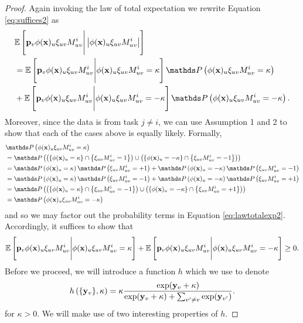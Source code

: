 \documentclass{article}
\begin{document}
\begin{lemma}
\begin{proof}
Again invoking the law of total expectation we rewrite Equation \ref{eq:suffices2} as
\begin{align}
\begin{split}
    &\E{\p_v \phi(\x)_u   \xi_{uv} M_{uv}^i \Bigg| \left| \phi(\x)_u   \xi_{uv} M_{uv}^i \right| } \\
    &= \E{\p_v \phi(\x)_u   \xi_{uv} M_{uv}^i \Bigg|  \phi(\x)_u   \xi_{uv} M_{uv}^i = \kappa }\PR{\phi(\x)_u   \xi_{uv} M_{uv}^i = \kappa} \\
    &+ \E{\p_v \phi(\x)_u   \xi_{uv} M_{uv}^i \Bigg|  \phi(\x)_u   \xi_{uv} M_{uv}^i = -\kappa }\PR{\phi(\x)_u   \xi_{uv} M_{uv}^i = -\kappa}.
    \end{split} \label{eq:lawtotalexp2}
\end{align}
Moreover, since the data is from task $j \neq i$, we can use Assumption 1 and 2 to show that each of the cases above is equally likely. Formally,
\begin{align}
    &\PR{\phi(\x)_u \xi_{uv} M_{uv}^i = \kappa}  \\
    &= \PR{ \round{\curly{\phi(\x)_u = \kappa} \cap \curly{ \xi_{uv} M_{uv}^i = 1 }} \cup \round{\curly{ \phi(\x)_u  = -\kappa } \cap \curly{ \xi_{uv} M_{uv}^i = -1 }}} \\
    &= \PR{\phi(\x)_u = \kappa } \PR{  \xi_{uv} M_{uv}^i = +1 } + \PR{ \phi(\x)_u  = -\kappa } \PR{ \xi_{uv} M_{uv}^i = -1 } \\
    &= \PR{\phi(\x)_u = \kappa } \PR{  \xi_{uv} M_{uv}^i = -1 } + \PR{ \phi(\x)_u  = -\kappa } \PR{ \xi_{uv} M_{uv}^i = +1 } \\
    &= \PR{ \round{\curly{\phi(\x)_u = \kappa} \cap \curly{ \xi_{uv} M_{uv}^i = -1 }} \cup \round{\curly{ \phi(\x)_u  = -\kappa } \cap \curly{ \xi_{uv} M_{uv}^i = +1 }}} \\
    &=\PR{\phi(\x)_u \xi_{uv} M_{uv}^i = -\kappa} 
\end{align}
and so we may factor out the probability terms in Equation \ref{eq:lawtotalexp2}. Accordingly, it suffices to show that
\begin{align} \label{eq:final-obj}
    \mathbb{E}\left\lbrack \mathbf{p}_v \phi(\mathbf{x})_u   \xi_{uv} M_{uv}^i \Bigg|  \phi(\mathbf{x})_u   \xi_{uv} M_{uv}^i = \kappa  \right\rbrack + \mathbb{E}\left\lbrack \mathbf{p}_v \phi(\mathbf{x})_u   \xi_{uv} M_{uv}^i \Bigg|  \phi(\mathbf{x})_u   \xi_{uv} M_{uv}^i = -\kappa  \right\rbrack \geq 0.
\end{align}
Before we proceed, we will introduce a function $h$ which we use to denote
\begin{align}
    h\left( \{\mathbf{y}_v\}, \kappa \right) = \kappa \frac{\exp(\mathbf{y}_v + \kappa)}{\exp(\mathbf{y}_v + \kappa) + \sum_{v' \neq v}\exp(\mathbf{y}_{v'})}.
\end{align}
for $\kappa > 0$. We will make use of two interesting properties of $h$.


\end{proof}
\end{lemma}
\end{document}
